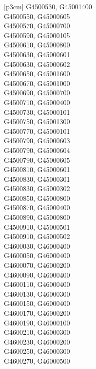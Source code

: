 \begin{customLongTable}{ |p{3cm}| }
G4500530, G45001400 \\ \hline
G4500550, G45000605 \\ \hline
G4500570, G45000700 \\ \hline
G4500590, G45000105 \\ \hline
G4500610, G45000800 \\ \hline
G4500630, G45000601 \\ \hline
G4500630, G45000602 \\ \hline
G4500650, G45001600 \\ \hline
G4500670, G45001000 \\ \hline
G4500690, G45000700 \\ \hline
G4500710, G45000400 \\ \hline
G4500730, G45000101 \\ \hline
G4500750, G45001300 \\ \hline
G4500770, G45000101 \\ \hline
G4500790, G45000603 \\ \hline
G4500790, G45000604 \\ \hline
G4500790, G45000605 \\ \hline
G4500810, G45000601 \\ \hline
G4500830, G45000301 \\ \hline
G4500830, G45000302 \\ \hline
G4500850, G45000800 \\ \hline
G4500870, G45000400 \\ \hline
G4500890, G45000800 \\ \hline
G4500910, G45000501 \\ \hline
G4500910, G45000502 \\ \hline
G4600030, G46000400 \\ \hline
G4600050, G46000400 \\ \hline
G4600070, G46000200 \\ \hline
G4600090, G46000400 \\ \hline
G4600110, G46000400 \\ \hline
G4600130, G46000300 \\ \hline
G4600150, G46000400 \\ \hline
G4600170, G46000200 \\ \hline
G4600190, G46000100 \\ \hline
G4600210, G46000300 \\ \hline
G4600230, G46000200 \\ \hline
G4600250, G46000300 \\ \hline
G4600270, G46000500 \\ \hline

\end{customLongTable}
